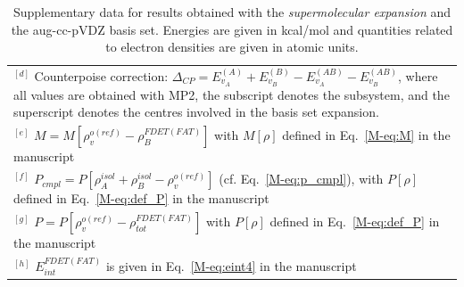 \documentclass[amsmath,amssymb,preprint,aip,jcp]{revtex4-1}
\begin{document}
\begin{table}[H]
\begin{center}
{\begin{tabular}{|l|l|l|l|l|l|l|l|l|l|}
\multicolumn{10}{p{1.0\textwidth}}{$^{[d]}$ Counterpoise correction: $\Delta_{CP} = E_{v_A}^{(A)} + E_{v_B}^{(B)} - E_{v_A}^{(AB)} - E_{v_B}^{(AB)}$, where all values are obtained with MP2, the subscript denotes the subsystem, and the superscript denotes the centres involved in the basis set expansion.} \\
\multicolumn{10}{p{1.0\textwidth}}{$^{[e]}$ $M=M[\rho_v^{o(ref)} - \rho^{FDET(FAT)}_{B}]$ with $M[\rho]$ defined in Eq.~\ref{M-eq:M} in the manuscript}\\
\multicolumn{10}{p{1.0\textwidth}}{$^{[f]}$ $P_{cmpl}=P[\rho_A^{isol}+\rho_B^{isol} - \rho_v^{o(ref)}]$ (cf. Eq.~\ref{M-eq:p_cmpl}), with $P[\rho]$ defined in Eq.~\ref{M-eq:def_P} in the manuscript}\\
\multicolumn{10}{p{1.0\textwidth}}{$^{[g]}$ $P=P[\rho_v^{o(ref)} - \rho_{tot}^{FDET(FAT)}]$ with $P[\rho]$ defined in Eq.~\ref{M-eq:def_P} in the manuscript}\\
\multicolumn{10}{p{1.0\textwidth}}{$^{[h]}$ $E^{FDET(FAT)}_{int}$ is given in Eq.~\ref{M-eq:eint4} in the manuscript}\\
\end{tabular}
}
\end{center}
\caption{Supplementary data for results obtained with the \textit{supermolecular expansion} and the aug-cc-pVDZ basis set. Energies are given in kcal/mol and quantities related to electron densities are given in atomic units.}
\end{table}
\end{document}
